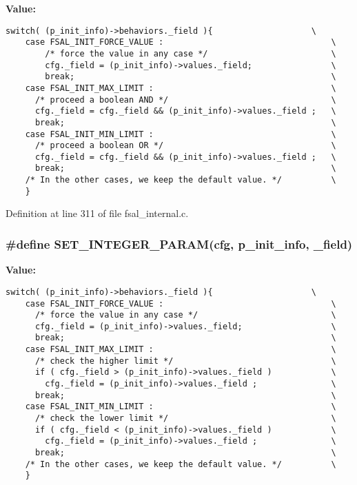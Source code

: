 \textbf{Value:}

\begin{Code}\begin{verbatim}switch( (p_init_info)->behaviors._field ){                    \
    case FSAL_INIT_FORCE_VALUE :                                  \
        /* force the value in any case */                         \
        cfg._field = (p_init_info)->values._field;                \
        break;                                                    \
    case FSAL_INIT_MAX_LIMIT :                                    \
      /* proceed a boolean AND */                                 \
      cfg._field = cfg._field && (p_init_info)->values._field ;   \
      break;                                                      \
    case FSAL_INIT_MIN_LIMIT :                                    \
      /* proceed a boolean OR */                                  \
      cfg._field = cfg._field && (p_init_info)->values._field ;   \
      break;                                                      \
    /* In the other cases, we keep the default value. */          \
    }
\end{verbatim}
\end{Code}


Definition at line 311 of file fsal\_\-internal.c.
\subsubsection[{SET\_\-INTEGER\_\-PARAM}]{\setlength{\rightskip}{0pt plus 5cm}\#define SET\_\-INTEGER\_\-PARAM(cfg, \/  p\_\-init\_\-info, \/  \_\-field)}\label{fsal__internal_8c_1338c45d33ed60654787c72596f36adc}


\textbf{Value:}

\begin{Code}\begin{verbatim}switch( (p_init_info)->behaviors._field ){                    \
    case FSAL_INIT_FORCE_VALUE :                                  \
      /* force the value in any case */                           \
      cfg._field = (p_init_info)->values._field;                  \
      break;                                                      \
    case FSAL_INIT_MAX_LIMIT :                                    \
      /* check the higher limit */                                \
      if ( cfg._field > (p_init_info)->values._field )            \
        cfg._field = (p_init_info)->values._field ;               \
      break;                                                      \
    case FSAL_INIT_MIN_LIMIT :                                    \
      /* check the lower limit */                                 \
      if ( cfg._field < (p_init_info)->values._field )            \
        cfg._field = (p_init_info)->values._field ;               \
      break;                                                      \
    /* In the other cases, we keep the default value. */          \
    }
\end{verbatim}
\end{Code}


